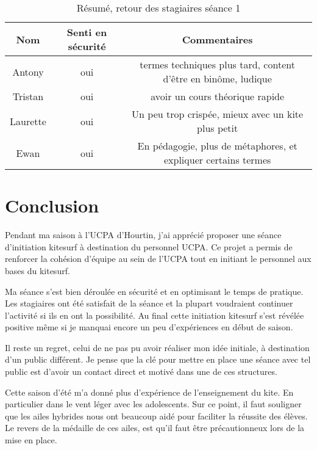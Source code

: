 \documentclass[11pt,a4paper]{report}
\begin{document}
\begin{table}
\begin{tabular}{|c|c|c|}
        \hline
        \textbf{Nom} & \textbf{Senti en sécurité} & \textbf{Commentaires} \\ 
        \hline
       Antony      &  oui    &   termes techniques plus tard, content d’être en binôme, ludique         \\
       \hline
       Tristan     &  oui    & avoir un cours théorique rapide  \\
       \hline
        Laurette   &  oui    & Un peu trop crispée, mieux avec un kite plus petit \\
        \hline
        Ewan       &  oui    & En pédagogie, plus de métaphores, et expliquer certains termes\\
        \hline
\end{tabular}
\caption{Résumé, retour des stagiaires séance 1\label{stagiaire_feedback}}
\end{table}


\FloatBarrier
\section{Conclusion}

Pendant ma saison à l'UCPA d'Hourtin, j'ai apprécié proposer une 
séance d'initiation kitesurf à destination du personnel UCPA.
Ce projet a permis de renforcer la cohésion d'équipe au sein de l'UCPA
tout en initiant le personnel aux bases du kitesurf. 

Ma séance s'est bien déroulée en sécurité et en optimisant 
le temps de pratique. Les stagiaires ont été  satisfait de la 
séance et la plupart voudraient continuer l'activité si ils en 
ont la possibilité. 
Au final cette initiation kitesurf s'est révélée  positive m\^eme si
je manquai encore un peu d'expériences en début de saison.

Il reste un regret, celui de ne pas pu avoir réaliser mon idée initiale, 
à destination d'un public différent. Je pense que la clé pour
mettre en place une séance avec tel public est d'avoir un contact
direct et motivé dans une de ces structures.


Cette saison d'été m'a donné plus d'expérience  
de l'enseignement du kite. En particulier dans le vent léger avec les adolescents.
Sur ce point, il faut souligner que les ailes hybrides nous ont beaucoup aidé pour 
faciliter la réussite des élèves. Le revers de la médaille de ces ailes, est qu'il 
faut \^etre précautionneux lors de la mise en place.
\end{document}
